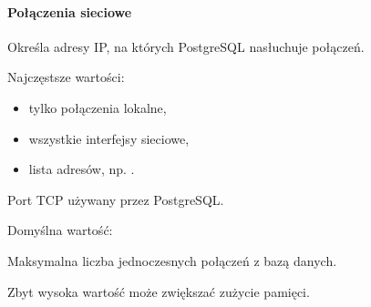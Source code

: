 \documentclass[a4paper,11pt,english,openany,oneside]{sphinxmanual}
\begin{document}
\paragraph{Połączenia sieciowe}
\label{\detokenize{rozdzial_2/rozdzial_22/index:polaczenia-sieciowe}}\begin{description}
\sphinxAtStartPar
Określa adresy IP, na których PostgreSQL nasłuchuje połączeń.

\sphinxAtStartPar
Najczęstsze wartości:
\begin{itemize}
\item {} 
\sphinxAtStartPar
{} \textendash{} tylko połączenia lokalne,

\item {} 
\sphinxAtStartPar
\sphinxcode{\sphinxupquote{*}} \textendash{} wszystkie interfejsy sieciowe,

\item {} 
\sphinxAtStartPar
lista adresów, np. .

\end{itemize}

\sphinxAtStartPar
Port TCP używany przez PostgreSQL.

\sphinxAtStartPar
Domyślna wartość:

\begin{sphinxVerbatim}[commandchars=\\\{\}]
\end{sphinxVerbatim}

\sphinxAtStartPar
Maksymalna liczba jednoczesnych połączeń z bazą danych.

\sphinxAtStartPar
Zbyt wysoka wartość może zwiększać zużycie pamięci.

\end{description}
\end{document}
